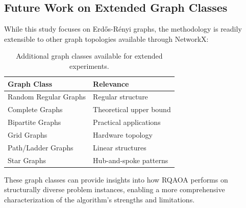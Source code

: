 \subsection{Future Work on Extended Graph Classes}
\label{subsec:future_graphs}

While this study focuses on Erdős-Rényi graphs, the methodology is readily extensible to other graph topologies available through NetworkX:

\begin{table}[h]
\centering
\begin{tabular}{ll}
\hline
    \textbf{Graph Class} & \textbf{Relevance} \\
\hline
    Random Regular Graphs & Regular structure \\
    Complete Graphs & Theoretical upper bound \\
    Bipartite Graphs & Practical applications \\
    Grid Graphs & Hardware topology\\
    Path/Ladder Graphs & Linear structures \\
    Star Graphs & Hub-and-spoke patterns \\
\hline
\end{tabular}
\caption{Additional graph classes available for extended experiments.}
\label{tab:future_graphs}
\end{table}

These graph classes can provide insights into how RQAOA performs on structurally diverse problem instances, enabling a more comprehensive characterization of the algorithm's strengths and limitations.


